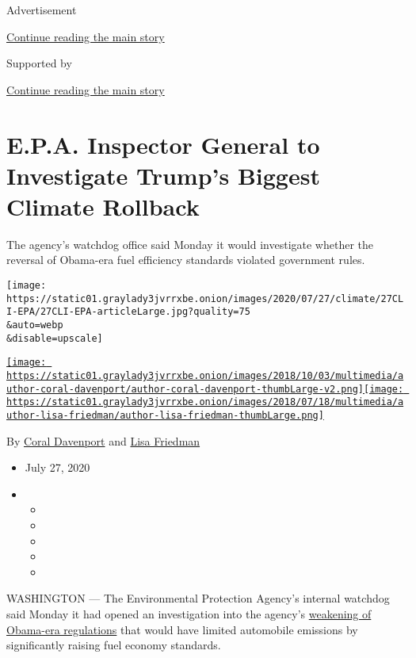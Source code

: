 Advertisement

\protect\hyperlink{after-top}{Continue reading the main story}

Supported by

\protect\hyperlink{after-sponsor}{Continue reading the main story}

\hypertarget{epa-inspector-general-to-investigate-trumps-biggest-climate-rollback}{%
\section{E.P.A. Inspector General to Investigate Trump's Biggest Climate
Rollback}\label{epa-inspector-general-to-investigate-trumps-biggest-climate-rollback}}

The agency's watchdog office said Monday it would investigate whether
the reversal of Obama-era fuel efficiency standards violated government
rules.

\texttt{[image: https://static01.graylady3jvrrxbe.onion/images/2020/07/27/climate/27CLI-EPA/27CLI-EPA-articleLarge.jpg?quality=75\\\&auto=webp\\\&disable=upscale]}

\href{https://www.nytimes3xbfgragh.onion/by/coral-davenport}{\texttt{[image: https://static01.graylady3jvrrxbe.onion/images/2018/10/03/multimedia/author-coral-davenport/author-coral-davenport-thumbLarge-v2.png]}}\href{https://www.nytimes3xbfgragh.onion/by/lisa-friedman}{\texttt{[image: https://static01.graylady3jvrrxbe.onion/images/2018/07/18/multimedia/author-lisa-friedman/author-lisa-friedman-thumbLarge.png]}}

By \href{https://www.nytimes3xbfgragh.onion/by/coral-davenport}{Coral
Davenport} and
\href{https://www.nytimes3xbfgragh.onion/by/lisa-friedman}{Lisa
Friedman}

\begin{itemize}
\item
  July 27, 2020
\item
  \begin{itemize}
  \item
  \item
  \item
  \item
  \item
  \end{itemize}
\end{itemize}

WASHINGTON --- The Environmental Protection Agency's internal watchdog
said Monday it had opened an investigation into the agency's
\href{https://www.nytimes3xbfgragh.onion/2020/03/30/climate/trump-fuel-economy.html}{weakening
of Obama-era regulations} that would have limited automobile emissions
by significantly raising fuel economy standards.

